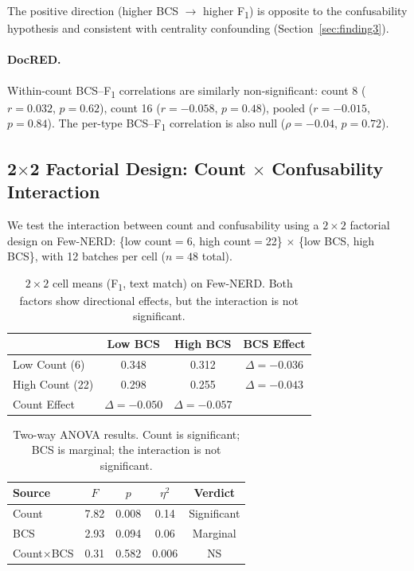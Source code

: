\documentclass[11pt,a4paper]{article}
\newcommand{\fone}{F\textsubscript{1}}
\begin{document}
The positive direction (higher BCS $\to$ higher \fone{}) is opposite to the confusability hypothesis and consistent with centrality confounding (Section~\ref{sec:finding3}).

\paragraph{DocRED.} Within-count BCS--\fone{} correlations are similarly non-significant: count 8 ($r{=}0.032$, $p{=}0.62$), count 16 ($r{=}{-}0.058$, $p{=}0.48$), pooled ($r{=}{-}0.015$, $p{=}0.84$).
The per-type BCS--\fone{} correlation is also null ($\rho{=}{-}0.04$, $p{=}0.72$).

\subsection{2$\times$2 Factorial Design: Count $\times$ Confusability Interaction}
\label{sec:factorial}

We test the interaction between count and confusability using a $2{\times}2$ factorial design on Few-NERD: \{low count$=$6, high count$=$22\} $\times$ \{low BCS, high BCS\}, with 12 batches per cell ($n{=}48$ total).

\begin{table}[t]
\centering
\caption{$2{\times}2$ cell means (\fone{}, text match) on Few-NERD. Both factors show directional effects, but the interaction is not significant.}
\label{tab:factorial_means}
\small
\begin{tabular}{lccc}
\toprule
 & \textbf{Low BCS} & \textbf{High BCS} & \textbf{BCS Effect} \\
\midrule
Low Count (6)  & 0.348 & 0.312 & $\Delta{=}{-}0.036$ \\
High Count (22) & 0.298 & 0.255 & $\Delta{=}{-}0.043$ \\
\midrule
Count Effect & $\Delta{=}{-}0.050$ & $\Delta{=}{-}0.057$ & \\
\bottomrule
\end{tabular}
\end{table}

\begin{table}[t]
\centering
\caption{Two-way ANOVA results. Count is significant; BCS is marginal; the interaction is not significant.}
\label{tab:anova}
\small
\begin{tabular}{lcccc}
\toprule
\textbf{Source} & \textbf{$F$} & \textbf{$p$} & \textbf{$\eta^2$} & \textbf{Verdict} \\
\midrule
Count       & 7.82 & 0.008 & 0.14  & Significant \\
BCS         & 2.93 & 0.094 & 0.06  & Marginal \\
Count$\times$BCS & 0.31 & 0.582 & 0.006 & NS \\
\bottomrule
\end{tabular}
\end{table}
\end{document}
